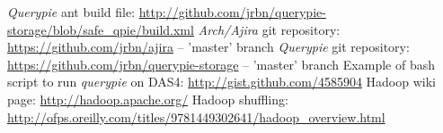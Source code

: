 \begin{thebibliography}{99}
		{\emph{Querypie} ant build file: \url{http://github.com/jrbn/querypie-storage/blob/safe_qpie/build.xml}}
		{\emph{Arch/Ajira} git repository: \url{https://github.com/jrbn/ajira} -- 'master' branch}
		{\emph{Querypie} git repository: \url{https://github.com/jrbn/querypie-storage} -- 'master' branch}
		{Example of bash script to run \emph{querypie} on DAS4: \url{http://gist.github.com/4585904}}
		{Hadoop wiki page: \url{http://hadoop.apache.org/}}
		{Hadoop shuffling: \url{http://ofps.oreilly.com/titles/9781449302641/hadoop_overview.html}}
\end{thebibliography}
